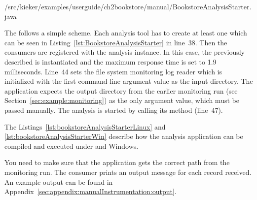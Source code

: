 \setJavaCodeListing       
%
{\manualInstrumentedBookstoreApplicationDir/src/kieker/examples/userguide/ch2bookstore/manual/BookstoreAnalysisStarter.java}

\noindent The  follows a simple scheme. Each %
analysis tool has to create at least one  which can be %
seen in Listing~\ref{lst:BookstoreAnalysisStarter} in line~38. Then the consumers %
are registered with the analysis instance. In this case, the previously described %
 is instantiated and the maximum response time is set to 1.9 milliseconds. %
Line~44 sets the file system monitoring log reader which is initialized with the first %
command-line argument value as the input directory. The application expects the %
output directory from the earlier monitoring run (see Section~\ref{sec:example:monitoring}) %
as the only argument value, which must be passed manually. %
The analysis is started by calling its  method (line~47). %


The Listings~\ref{lst:bookstoreAnalysisStarterLinux} and \ref{lst:bookstoreAnalysisStarterWin} %
describe how the analysis application can be compiled and executed under \UnixLikeSystems{} and Windows.

\setBashListing 		

	
	

\noindent You need to make sure that the application gets the correct path from the monitoring run. 
The consumer prints an output message for each record received. %
An example output can be found in Appendix~\ref{sec:appendix:manualInstrumentation:output}.
